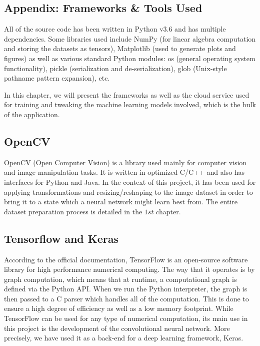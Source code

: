\begin{appendix}
\begin{center}
	\chapter{Appendix: Frameworks \& Tools Used}
\end{center}
All of the source code has been written in Python v3.6 and has multiple dependencies. Some libraries used include NumPy (for linear algebra computation and storing the datasets as tensors), Matplotlib (used to generate plots and figures) as well as various standard Python modules: os (general operating system functionality), pickle (serialization and de-serialization), glob (Unix-style pathname pattern expansion), etc.

In this chapter, we will present the frameworks as well as the cloud service used for training and tweaking the machine learning models involved, which is the bulk of the application.

\section{OpenCV}
OpenCV (Open Computer Vision)\cite{OpenCV} is a library used mainly for computer vision and image manipulation tasks. It is written in optimized C/C++ and also has interfaces for Python and Java. In the context of this project, it has been used for applying transformations and resizing/reshaping to the image dataset in order to bring it to a state which a neural network might learn best from. The entire dataset preparation process is detailed in the $1st$ chapter.
\section{Tensorflow and Keras}
According to the official documentation\cite{TFDocs}, TensorFlow is an open-source software library for high performance numerical computing.
The way that it operates is by graph computation, which means that at runtime, a computational graph is defined via the Python API. When we run the Python interpreter, the graph is then passed to a C parser which handles all of the computation. This is done to ensure a high degree of efficiency as well as a low memory footprint. While TensorFlow can be used for any type of numerical computation, its main use in this project is the development of the convolutional neural network. More precisely, we have used it as a back-end for a deep learning framework, Keras.


\end{appendix}
